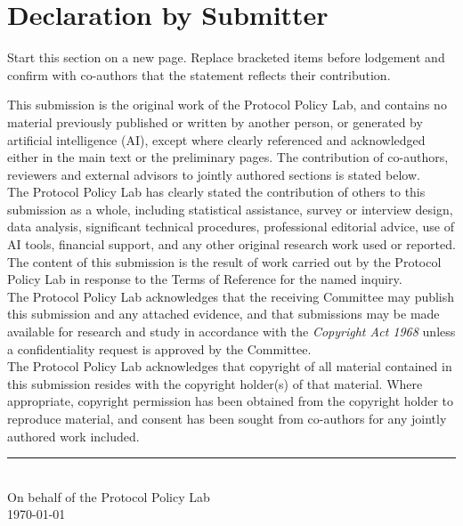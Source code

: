 
\section{Declaration by Submitter}

\begin{instructional}
Start this section on a new page. Replace bracketed items before lodgement and confirm with co-authors that the statement reflects their contribution.
\end{instructional}

\noindent
This submission is the original work of the Protocol Policy Lab, and contains no material previously published or written by another person, or generated by artificial intelligence (AI), except where clearly referenced and acknowledged either in the main text or the preliminary pages. The contribution of co-authors, reviewers and external advisors to jointly authored sections is stated below.\\

\noindent
The Protocol Policy Lab has clearly stated the contribution of others to this submission as a whole, including statistical assistance, survey or interview design, data analysis, significant technical procedures, professional editorial advice, use of AI tools, financial support, and any other original research work used or reported. The content of this submission is the result of work carried out by the Protocol Policy Lab in response to the Terms of Reference for the named inquiry.\\

\noindent
The Protocol Policy Lab acknowledges that the receiving Committee may publish this submission and any attached evidence, and that submissions may be made available for research and study in accordance with the \textit{Copyright Act 1968} unless a confidentiality request is approved by the Committee.\\

\noindent
The Protocol Policy Lab acknowledges that copyright of all material contained in this submission resides with the copyright holder(s) of that material. Where appropriate, copyright permission has been obtained from the copyright holder to reproduce material, and consent has been sought from co-authors for any jointly authored work included.\\

\vspace{2em}
\noindent\rule{6cm}{0.4pt}\\
On behalf of the Protocol Policy Lab\\
\today
